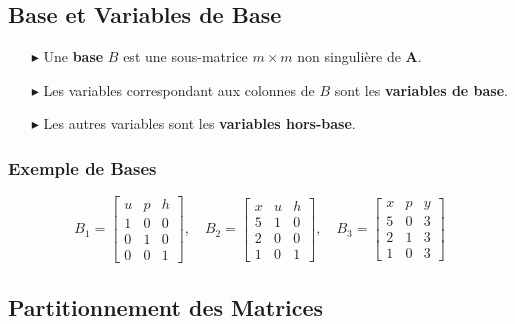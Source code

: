 \documentclass{report}
\begin{document}
\begin{multicols*}{2}
\subsection{Base et Variables de Base}

\begin{itemize}
    \item[$\blacktriangleright$] Une \textbf{base} \( B \) est une sous-matrice \( m \times m \) non singulière de \( \mathbf{A} \).
    \item[$\blacktriangleright$] Les variables correspondant aux colonnes de \( B \) sont les \textbf{variables de base}.
    \item[$\blacktriangleright$] Les autres variables sont les \textbf{variables hors-base}.
\end{itemize}

\subsubsection{Exemple de Bases}

\[
B_1 = 
\begin{bmatrix}
u & p & h \\
1 & 0 & 0 \\
0 & 1 & 0 \\
0 & 0 & 1
\end{bmatrix}, \quad
B_2 = 
\begin{bmatrix}
x & u & h \\
5 & 1 & 0 \\
2 & 0 & 0 \\
1 & 0 & 1
\end{bmatrix}, \quad
B_3 = 
\begin{bmatrix}
x & p & y \\
5 & 0 & 3 \\
2 & 1 & 3 \\
1 & 0 & 3
\end{bmatrix}
\]

\subsection{Partitionnement des Matrices}


\end{multicols*}
\end{document}
